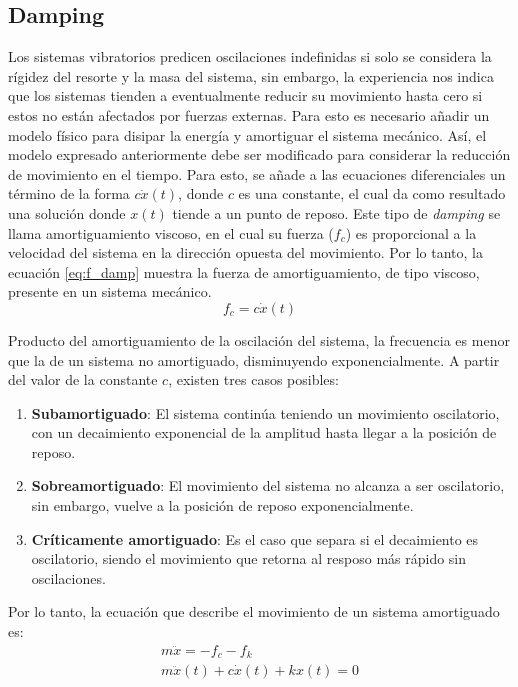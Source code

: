 \subsection{Damping}
\label{sec:damping}
Los sistemas vibratorios predicen oscilaciones indefinidas si solo se considera la rígidez del resorte y la masa del sistema, sin embargo, la experiencia nos indica que los sistemas tienden a eventualmente reducir su movimiento hasta cero si estos no están afectados por fuerzas externas. Para esto es necesario añadir un modelo físico para disipar la energía y amortiguar el sistema mecánico. Así, el modelo expresado anteriormente debe ser modificado para considerar la reducción de movimiento en el tiempo. Para esto, se añade a las ecuaciones diferenciales un término de la forma $c\dot{x}(t)$, donde $c$ es una constante, el cual da como resultado una solución donde $x(t)$ tiende a un punto de reposo. Este tipo de \textit{damping} se llama amortiguamiento viscoso, en el cual su fuerza ($f_c$) es proporcional a la velocidad del sistema en la dirección opuesta del movimiento. Por lo tanto, la ecuación \ref{eq:f_damp} muestra la fuerza de amortiguamiento, de tipo viscoso, presente en un sistema mecánico.
\begin{equation}\label{eq:f_damp}
	f_c = c\dot{x}(t)
\end{equation}

Producto del amortiguamiento de la oscilación del sistema, la frecuencia es menor que la de un sistema no amortiguado, disminuyendo exponencialmente. A partir del valor de la constante $c$, existen tres casos posibles:
\begin{enumerate}
	\item \textbf{Subamortiguado}: El sistema continúa teniendo un movimiento oscilatorio, con un decaimiento exponencial de la amplitud hasta llegar a la posición de reposo.
	\item \textbf{Sobreamortiguado}: El movimiento del sistema no alcanza a ser oscilatorio, sin embargo, vuelve a la posición de reposo exponencialmente.
	\item \textbf{Críticamente amortiguado}: Es el caso que separa si el decaimiento es oscilatorio, siendo el movimiento que retorna al resposo más rápido sin oscilaciones.
\end{enumerate}

Por lo tanto, la ecuación que describe el movimiento de un sistema amortiguado es:
\begin{gather*}
	m\ddot{x} = -f_c - f_k \\
	m\ddot{x}(t) + c\dot{x}(t) + kx(t) = 0 
\end{gather*}

